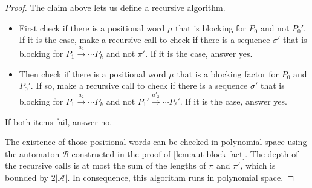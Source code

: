 \documentclass[letterpaper, USenglish, cleveref, autoref, thm-restate, numberwithinsect]{lipics-v2021}
\theoremstyle{theorem}
\theoremstyle{definition}
\newcommand{\Aa}{\mathcal{A}}
\newcommand{\Bb}{\mathcal{B}}
\newcommand{\SCCpath}{\pi}
\begin{document}
\begin{proof}
	The claim above lets us define a recursive algorithm.
	
	\begin{itemize}
		\item First check if there is a positional word $\mu$ that is blocking for $P_0$ and not $P_0'$.
		If it is the case, make a recursive call to check if there is a sequence $\sigma'$ that is blocking for $P_1 \xrightarrow{a_2} \cdots  P_k$ and not $\SCCpath'$.
		If it is the case, answer yes.
		
		\item Then check if there is a positional word $\mu$ that is a blocking factor for $P_0$ and $P_0'$. If so, make a recursive call to check if there is a sequence $\sigma'$ that is blocking for $P_1 \xrightarrow{a_2} \cdots  P_k$ and not $P_1' \xrightarrow{a'_2} \cdots  P_\ell'$.
		If it is the case, answer yes.
	\end{itemize}
	
	If both items fail, answer no.
	
	The existence of those positional words can be checked in polynomial space using the automaton $\Bb$ constructed in the proof of \cref{lem:aut-block-fact}.
	The depth of the recursive calls is at most the sum of the lengths of $\SCCpath$ and $\SCCpath'$, which is bounded by $2|\Aa|$.
	In consequence, this algorithm runs in polynomial space.
	
\end{proof}
\end{document}
